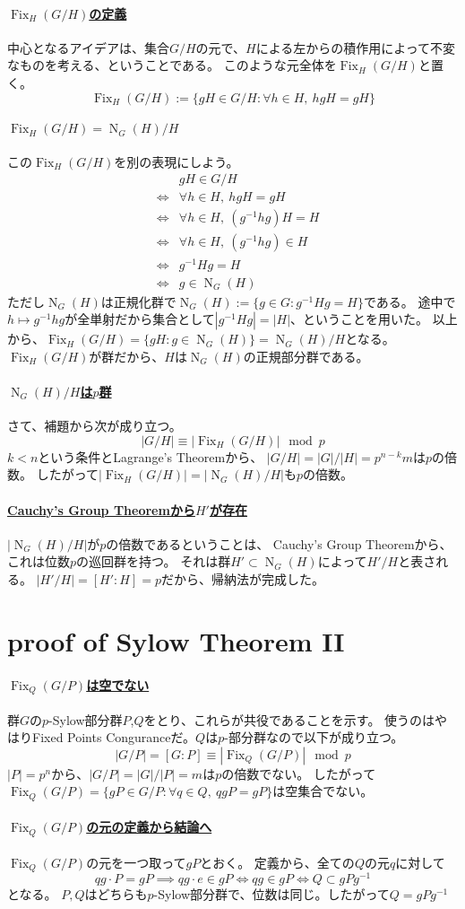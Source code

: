 \documentclass[a4paper]{jarticle}
\newcommand{\Fix}{\operatorname{Fix}}
\newcommand{\Norm}{\operatorname{N}}
\newcommand{\ulpar}[1]{\paragraph{\underline{#1}}}
\begin{document}
    \ulpar{$\Fix_{H}(G/H)$の定義}
    中心となるアイデアは、集合$G/H$の元で、$H$による左からの積作用によって不変なものを考える、ということである。
    このような元全体を$\Fix_{H}(G/H)$と置く。
    \[
        \Fix_{H}(G/H) := \{ gH \in G/H : \forall h \in H,~ hgH=gH \}
    \]

    \ulpar{$\Fix_{H}(G/H)=\Norm_G(H)/H$}
    この$\Fix_{H}(G/H)$を別の表現にしよう。
    \begin{eqnarray*}
        &{}&    gH \in G/H \\
        &\iff&  \forall h \in H,~ hgH=gH \\
        &\iff&  \forall h \in H,~ (g^{-1}hg)H=H \\
        &\iff&  \forall h \in H,~ (g^{-1}hg) \in H \\
        &\iff&  g^{-1}Hg = H \\
        &\iff&  g \in \Norm_G(H)
    \end{eqnarray*}
    ただし$\Norm_G(H)$は正規化群で$\Norm_G(H) := \{ g \in G : g^{-1}Hg = H\}$である。
    途中で$h \mapsto g^{-1}hg$が全単射だから集合として$|g^{-1}Hg|=|H|$、ということを用いた。
    以上から、$\Fix_{H}(G/H)=\{ gH : g \in \Norm_G(H) \} = \Norm_G(H)/H$となる。
    $\Fix_{H}(G/H)$が群だから、$H$は$\Norm_G(H)$の正規部分群である。

    \ulpar{$\Norm_G(H)/H$は$p$群}
    さて、補題から次が成り立つ。
    \[ |G/H| \equiv |\Fix_{H}(G/H)| \mod p \]
    $k<n$という条件とLagrange's Theoremから、
    $|G/H|=|G|/|H|=p^{n-k}m$は$p$の倍数。
    したがって$|\Fix_{H}(G/H)|=|\Norm_G(H)/H|$も$p$の倍数。

    \ulpar{Cauchy's Group Theoremから$H'$が存在}
    $|\Norm_G(H)/H|$が$p$の倍数であるということは、
    Cauchy's Group Theoremから、これは位数$p$の巡回群を持つ。
    それは群$H' \subset \Norm_G(H)$によって$H'/H$と表される。
    $|H'/H|=[H':H]=p$だから、帰納法が完成した。
    

    \section{proof of Sylow Theorem II}
    \ulpar{$\Fix_Q(G/P)$は空でない}
    群$G$の$p$-Sylow部分群$P$,$Q$をとり、これらが共役であることを示す。
    使うのはやはりFixed Points Conguranceだ。$Q$は$p$-部分群なので以下が成り立つ。
    \[ |G/P|=[G:P] \equiv |\Fix_Q(G/P)| \mod p \]
    $|P|=p^n$から、$|G/P|=|G|/|P|=m$は$p$の倍数でない。
    したがって$\Fix_Q(G/P)=\{ gP \in G/P : \forall q \in Q,~ qgP=gP \}$は空集合でない。

    \ulpar{$\Fix_Q(G/P)$の元の定義から結論へ}
    $\Fix_Q(G/P)$の元を一つ取って$gP$とおく。
    定義から、全ての$Q$の元$q$に対して
    \[ qg \cdot P=gP \implies qg \cdot e \in gP \iff qg \in gP \iff Q \subset gPg^{-1} \]となる。
    $P,Q$はどちらも$p$-Sylow部分群で、位数は同じ。したがって$Q=gPg^{-1}$
    
\end{document}
